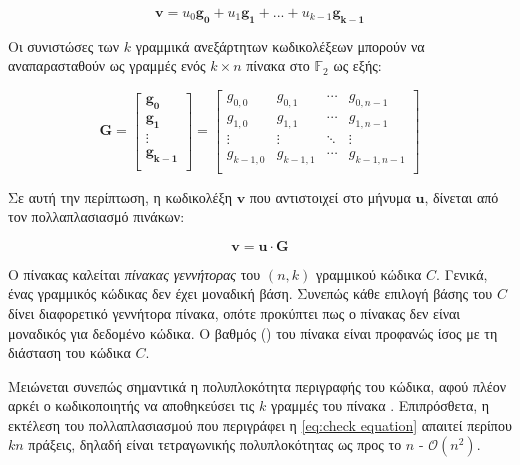 \begin{equation}
\mathbf{v}=u_0\mathbf{g_0}+u_1\mathbf{g_1}+...+u_{k-1}\mathbf{g_{k-1}}
\label{eq:codeword formation}
\end{equation}

Οι συνιστώσες των $k$ γραμμικά ανεξάρτητων κωδικολέξεων μπορούν να αναπαρασταθούν ως γραμμές ενός $k\times n$ πίνακα στο $\mathbb{F}_2$ ως εξής:

\begin{equation}
\mathbf{G}=\begin{bmatrix}\mathbf{g_0}\\\mathbf{g_1}\\\vdots\\\mathbf{g_{k-1}}\\\end{bmatrix}=\begin{bmatrix}g_{0,0} & g_{0,1} & \cdots & g_{0,n-1}\\g_{1,0} & g_{1,1} & \cdots & g_{1,n-1}\\\vdots & \vdots & \ddots & \vdots\\g_{k-1,0} & g_{k-1,1} & \cdots & g_{k-1,n-1}\\\end{bmatrix}
\label{eq:generator matrix}
\end{equation}

Σε αυτή την περίπτωση, η κωδικολέξη $\mathbf{v}$ που αντιστοιχεί στο μήνυμα $\mathbf{u}$, δίνεται από τον πολλαπλασιασμό πινάκων: 

\begin{equation}
\mathbf{v=u \cdot G}
\label{eq:check equation}
\end{equation}

Ο πίνακας  καλείται \textit{πίνακας γεννήτορας}  του $(n,k)$ γραμμικού  κώδικα $C$. Γενικά, ένας γραμμικός  κώδικας δεν έχει μοναδική βάση. Συνεπώς κάθε επιλογή βάσης του $C$ δίνει διαφορετικό γεννήτορα πίνακα, οπότε προκύπτει πως ο πίνακας  δεν είναι μοναδικός για δεδομένο κώδικα. Ο βαθμός () του πίνακα  είναι προφανώς ίσος με τη διάσταση του κώδικα $C$.

Μειώνεται συνεπώς σημαντικά η πολυπλοκότητα περιγραφής του κώδικα, αφού πλέον αρκέι ο κωδικοποιητής να αποθηκεύσει τις $k$ γραμμές του πίνακα . Επιπρόσθετα, η εκτέλεση του πολλαπλασιασμού που περιγράφει η \ref{eq:check equation} απαιτεί περίπου $kn$ πράξεις, δηλαδή είναι τετραγωνικής πολυπλοκότητας ως προς το $n$ - $\mathcal{O}(n^2)$.

